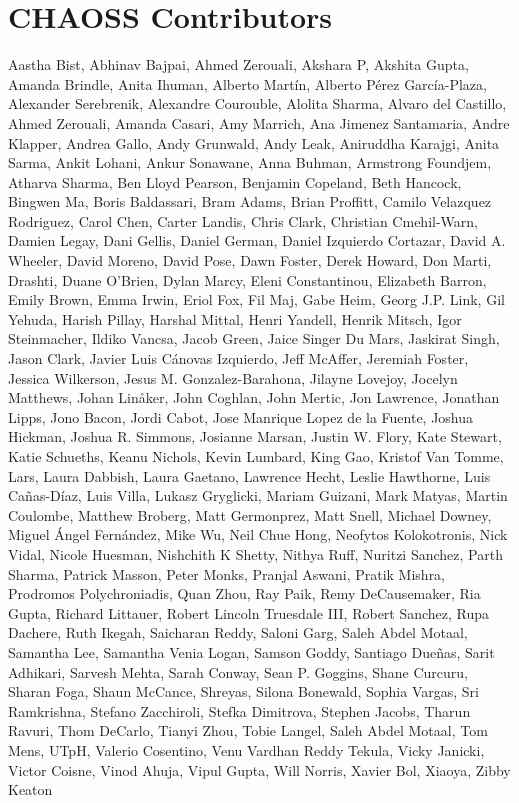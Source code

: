 \hypertarget{chaoss-contributors}{%
\section{CHAOSS Contributors}\label{chaoss-contributors}}

Aastha Bist, Abhinav Bajpai, Ahmed Zerouali, Akshara P, Akshita Gupta,
Amanda Brindle, Anita Ihuman, Alberto Martín, Alberto Pérez
García-Plaza, Alexander Serebrenik, Alexandre Courouble, Alolita Sharma,
Alvaro del Castillo, Ahmed Zerouali, Amanda Casari, Amy Marrich, Ana
Jimenez Santamaria, Andre Klapper, Andrea Gallo, Andy Grunwald, Andy
Leak, Aniruddha Karajgi, Anita Sarma, Ankit Lohani, Ankur Sonawane, Anna
Buhman, Armstrong Foundjem, Atharva Sharma, Ben Lloyd Pearson, Benjamin
Copeland, Beth Hancock, Bingwen Ma, Boris Baldassari, Bram Adams, Brian
Proffitt, Camilo Velazquez Rodriguez, Carol Chen, Carter Landis, Chris
Clark, Christian Cmehil-Warn, Damien Legay, Dani Gellis, Daniel German,
Daniel Izquierdo Cortazar, David A. Wheeler, David Moreno, David Pose,
Dawn Foster, Derek Howard, Don Marti, Drashti, Duane O'Brien, Dylan
Marcy, Eleni Constantinou, Elizabeth Barron, Emily Brown, Emma Irwin,
Eriol Fox, Fil Maj, Gabe Heim, Georg J.P. Link, Gil Yehuda, Harish
Pillay, Harshal Mittal, Henri Yandell, Henrik Mitsch, Igor Steinmacher,
Ildiko Vancsa, Jacob Green, Jaice Singer Du Mars, Jaskirat Singh, Jason
Clark, Javier Luis Cánovas Izquierdo, Jeff McAffer, Jeremiah Foster,
Jessica Wilkerson, Jesus M. Gonzalez-Barahona, Jilayne Lovejoy, Jocelyn
Matthews, Johan Linåker, John Coghlan, John Mertic, Jon Lawrence,
Jonathan Lipps, Jono Bacon, Jordi Cabot, Jose Manrique Lopez de la
Fuente, Joshua Hickman, Joshua R. Simmons, Josianne Marsan, Justin W.
Flory, Kate Stewart, Katie Schueths, Keanu Nichols, Kevin Lumbard, King
Gao, Kristof Van Tomme, Lars, Laura Dabbish, Laura Gaetano, Lawrence
Hecht, Leslie Hawthorne, Luis Cañas-Díaz, Luis Villa, Lukasz Gryglicki,
Mariam Guizani, Mark Matyas, Martin Coulombe, Matthew Broberg, Matt
Germonprez, Matt Snell, Michael Downey, Miguel Ángel Fernández, Mike Wu,
Neil Chue Hong, Neofytos Kolokotronis, Nick Vidal, Nicole Huesman,
Nishchith K Shetty, Nithya Ruff, Nuritzi Sanchez, Parth Sharma, Patrick
Masson, Peter Monks, Pranjal Aswani, Pratik Mishra, Prodromos
Polychroniadis, Quan Zhou, Ray Paik, Remy DeCausemaker, Ria Gupta,
Richard Littauer, Robert Lincoln Truesdale III, Robert Sanchez, Rupa
Dachere, Ruth Ikegah, Saicharan Reddy, Saloni Garg, Saleh Abdel Motaal,
Samantha Lee, Samantha Venia Logan, Samson Goddy, Santiago Dueñas, Sarit
Adhikari, Sarvesh Mehta, Sarah Conway, Sean P. Goggins, Shane Curcuru,
Sharan Foga, Shaun McCance, Shreyas, Silona Bonewald, Sophia Vargas, Sri
Ramkrishna, Stefano Zacchiroli, Stefka Dimitrova, Stephen Jacobs, Tharun
Ravuri, Thom DeCarlo, Tianyi Zhou, Tobie Langel, Saleh Abdel Motaal, Tom
Mens, UTpH, Valerio Cosentino, Venu Vardhan Reddy Tekula, Vicky Janicki,
Victor Coisne, Vinod Ahuja, Vipul Gupta, Will Norris, Xavier Bol,
Xiaoya, Zibby Keaton

